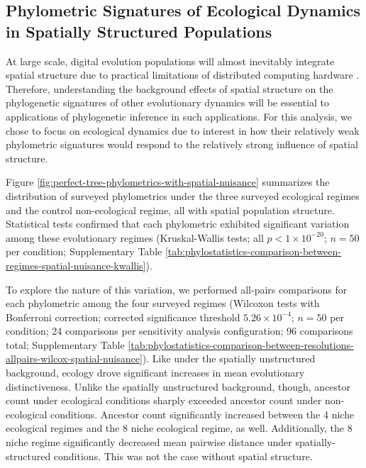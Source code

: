 \subsection{Phylometric Signatures of Ecological Dynamics in Spatially Structured Populations}



At large scale, digital evolution populations will almost inevitably integrate spatial structure due to practical limitations of distributed computing hardware \citep{ackley2014indefinitely}.
Therefore, understanding the background effects of spatial structure on the phylogenetic signatures of other evolutionary dynamics will be essential to applications of phylogenetic inference in such applications.
For this analysis, we chose to focus on ecological dynamics due to interest in how their relatively weak phylometric signatures would respond to the relatively strong influence of spatial structure.

Figure \ref{fig:perfect-tree-phylometrics-with-spatial-nuisance} summarizes the distribution of surveyed phylometrics under the three surveyed ecological regimes and the control non-ecological regime, all with spatial population structure.
Statistical tests confirmed that each phylometric exhibited significant variation among these evolutionary regimes (Kruskal-Wallis tests; all $p < 1\times10^{-20}$; $n=50$ per condition; Supplementary Table \ref{tab:phylostatistics-comparison-between-regimes-spatial-nuisance-kwallis}).

To explore the nature of this variation, we performed all-pairs comparisons for each phylometric among the four surveyed regimes (Wilcoxon tests with Bonferroni correction; corrected significance threshold $5.26 \times 10^{-4}$; $n=50$ per condition; 24 comparisons per sensitivity analysis configuration; 96 comparisons total; Supplementary Table \ref{tab:phylostatistics-comparison-between-resolutions-allpairs-wilcox-spatial-nuisance}).
Like under the spatially unstructured background, ecology drove significant increases in mean evolutionary distinctiveness.
Unlike the spatially unstructured background, though, ancestor count under ecological conditions sharply exceeded ancestor count under non-ecological conditions.
Ancestor count significantly increased between the 4 niche ecological regimes and the 8 niche ecological regime, as well.
Additionally, the 8 niche regime significantly decreased mean pairwise distance under spatially-structured conditions.
This was not the case without spatial structure.

